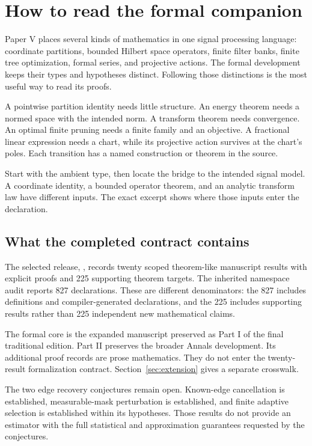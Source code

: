 \section{How to read the formal companion}
\label{sec:reading}
Paper V places several kinds of mathematics in one signal processing language: coordinate partitions, bounded Hilbert space operators, finite filter banks, finite tree optimization, formal series, and projective actions. The formal development keeps their types and hypotheses distinct. Following those distinctions is the most useful way to read its proofs.

A pointwise partition identity needs little structure. An energy theorem needs a normed space with the intended norm. A transform theorem needs convergence. An optimal finite pruning needs a finite family and an objective. A fractional linear expression needs a chart, while its projective action survives at the chart's poles. Each transition has a named construction or theorem in the source.

\begin{keyidea}[title={Follow the model before the theorem name}]
Start with the ambient type, then locate the bridge to the intended signal model. A coordinate identity, a bounded operator theorem, and an analytic transform law have different inputs. The exact excerpt shows where those inputs enter the declaration.
\end{keyidea}

\subsection{What the completed contract contains}
The selected release, , records twenty scoped theorem-like manuscript results with explicit proofs and 225 supporting theorem targets. The inherited namespace audit reports 827 declarations. These are different denominators: the 827 includes definitions and compiler-generated declarations, and the 225 includes supporting results rather than 225 independent new mathematical claims.

The formal core is the expanded manuscript preserved as Part I of the final traditional edition. Part II preserves the broader Annals development. Its additional proof records are prose mathematics. They do not enter the twenty-result formalization contract. Section~\ref{sec:extension} gives a separate crosswalk.

The two edge recovery conjectures remain open. Known-edge cancellation is established, measurable-mask perturbation is established, and finite adaptive selection is established within its hypotheses. Those results do not provide an estimator with the full statistical and approximation guarantees requested by the conjectures.

